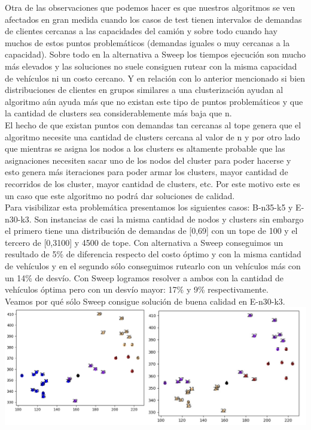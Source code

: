 \documentclass[11pt,a4paper]{article}
\begin{document}
Otra de las observaciones que podemos hacer es que nuestros algoritmos se ven afectados en gran medida cuando los casos de test tienen intervalos de demandas de clientes cercanas a las capacidades del camión y sobre todo cuando hay muchos de estos puntos problemáticos (demandas iguales o muy cercanas a la capacidad). Sobre todo en la alternativa a Sweep los tiempos ejecución son mucho más elevados y las soluciones no suele consiguen rutear con la misma capacidad de vehículos ni un costo cercano. Y en relación con lo anterior mencionado si bien distribuciones de clientes en grupos similares a una clusterización ayudan al algoritmo aún ayuda más que no existan este tipo de puntos problemáticos y que la cantidad de clusters sea considerablemente más baja que n.
\\

El hecho de que existan puntos con demandas tan cercanas al tope genera que el algoritmo necesite una cantidad de clusters cercana al valor de n y por otro lado que mientras se asigna los nodos a los clusters es altamente probable que las asignaciones necesiten sacar uno de los nodos del cluster para poder  hacerse y esto genera más iteraciones para poder armar los clusters, mayor cantidad de recorridos de los cluster, mayor cantidad de clusters, etc. Por este motivo este es un caso que este algoritmo no podrá dar soluciones de calidad.\\
Para visibilizar esta problemática presentamos los siguientes casos: B-n35-k5 y E-n30-k3. Son  instancias de casi la misma cantidad de nodos y clusters sin embargo el primero tiene una distribución de demandas de [0,69] con un tope de 100 y el tercero de [0,3100] y 4500 de tope. Con alternativa a Sweep conseguimos un resultado de 5\% de diferencia respecto del costo óptimo y con la misma cantidad de vehículos y en el segundo sólo conseguimos rutearlo con un vehículos más con un 14\% de desvío. 
Con Sweep logramos resolver a ambos con la cantidad de vehículos óptima pero con un desvío mayor: 17\% y 9\% respectivamente.
\\
Veamos por qué sólo Sweep consigue solución de buena calidad en E-n30-k3.
\includegraphics[scale=.5]{graf/comparativa_en30k3.png}
\end{document}
